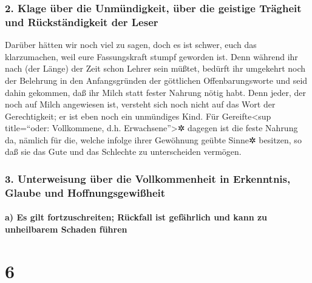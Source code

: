 \hypertarget{klage-uxfcber-die-unmuxfcndigkeit-uxfcber-die-geistige-truxe4gheit-und-ruxfcckstuxe4ndigkeit-der-leser}{%
\subsubsection{2. Klage über die Unmündigkeit, über die geistige
Trägheit und Rückständigkeit der
Leser}\label{klage-uxfcber-die-unmuxfcndigkeit-uxfcber-die-geistige-truxe4gheit-und-ruxfcckstuxe4ndigkeit-der-leser}}

 Darüber hätten wir noch viel zu sagen, doch es ist
schwer, euch das klarzumachen, weil eure Fassungskraft stumpf geworden
ist.  Denn während ihr nach (der Länge) der Zeit schon
Lehrer sein müßtet, bedürft ihr umgekehrt noch der Belehrung in den
Anfangsgründen der göttlichen Offenbarungsworte und seid dahin gekommen,
daß ihr Milch statt fester Nahrung nötig habt.  Denn
jeder, der noch auf Milch angewiesen ist, versteht sich noch nicht auf
das Wort der Gerechtigkeit; er ist eben noch ein unmündiges Kind.
 Für Gereifte\textless sup title=``oder: Vollkommene,
d.h. Erwachsene''\textgreater✲ dagegen ist die feste Nahrung da, nämlich
für die, welche infolge ihrer Gewöhnung geübte Sinne✲ besitzen, so daß
sie das Gute und das Schlechte zu unterscheiden vermögen.

\hypertarget{unterweisung-uxfcber-die-vollkommenheit-in-erkenntnis-glaube-und-hoffnungsgewiuxdfheit}{%
\subsubsection{3. Unterweisung über die Vollkommenheit in Erkenntnis,
Glaube und
Hoffnungsgewißheit}\label{unterweisung-uxfcber-die-vollkommenheit-in-erkenntnis-glaube-und-hoffnungsgewiuxdfheit}}

\hypertarget{a-es-gilt-fortzuschreiten-ruxfcckfall-ist-gefuxe4hrlich-und-kann-zu-unheilbarem-schaden-fuxfchren}{%
\paragraph{a) Es gilt fortzuschreiten; Rückfall ist gefährlich und kann
zu unheilbarem Schaden
führen}\label{a-es-gilt-fortzuschreiten-ruxfcckfall-ist-gefuxe4hrlich-und-kann-zu-unheilbarem-schaden-fuxfchren}}

\hypertarget{section-5}{%
\section{6}\label{section-5}}

